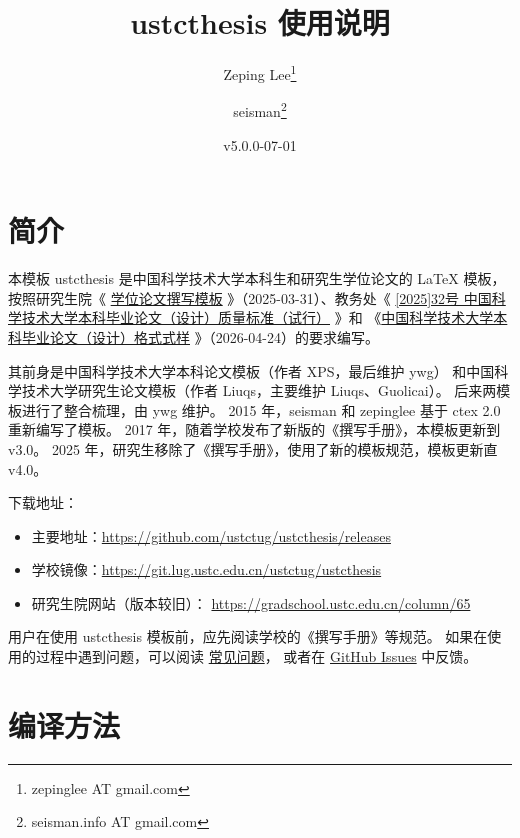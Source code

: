 \documentclass[a4paper]{ltxdoc}
\DeclareRobustCommand\pkg{\textsf}
\DeclareRobustCommand\cls{\textsf}
\begin{document}
\title{\cls{ustcthesis} 使用说明}
\author{Zeping Lee\thanks{zepinglee AT gmail.com} \and
        seisman\thanks{seisman.info AT gmail.com} }
\date{v5.0.0-07-01}
\maketitle



\section{简介}

本模板 \cls{ustcthesis} 是中国科学技术大学本科生和研究生学位论文的 \LaTeX{}
模板， 按照研究生院《
\href{https://gradschool.ustc.edu.cn/column/65}{学位论文撰写模板}
》（2025-03-31）、教务处《
\href{https://www.teach.ustc.edu.cn/?attachment_id=19501}
  {[2025]32号 中国科学技术大学本科毕业论文（设计）质量标准（试行）}
》和
《\href{https://www.teach.ustc.edu.cn/?attachment_id=13867}
  {中国科学技术大学本科毕业论文（设计）格式式样}
》（2026-04-24）的要求编写。

其前身是中国科学技术大学本科论文模板（作者 XPS，最后维护 ywg）
和中国科学技术大学研究生论文模板（作者 Liuqs，主要维护 Liuqs、Guolicai）。
后来两模板进行了整合梳理，由 ywg 维护。
2015 年，seisman 和 zepinglee 基于 \pkg{ctex} 2.0 重新编写了模板。
2017 年，随着学校发布了新版的《撰写手册》，本模板更新到 v3.0。
2025 年，研究生移除了《撰写手册》，使用了新的模板规范，模板更新直 v4.0。

下载地址：
\begin{itemize}
  \item 主要地址：\url{https://github.com/ustctug/ustcthesis/releases}
  \item 学校镜像：\url{https://git.lug.ustc.edu.cn/ustctug/ustcthesis}
  \item 研究生院网站（版本较旧）：
    \url{https://gradschool.ustc.edu.cn/column/65}
\end{itemize}

用户在使用 \pkg{ustcthesis} 模板前，应先阅读学校的《撰写手册》等规范。
如果在使用的过程中遇到问题，可以阅读
\href{https://github.com/ustctug/ustcthesis/wiki}{常见问题}，
或者在 \href{https://github.com/ustctug/ustcthesis/issues}{GitHub Issues}
中反馈。



\section{编译方法}
\end{document}
